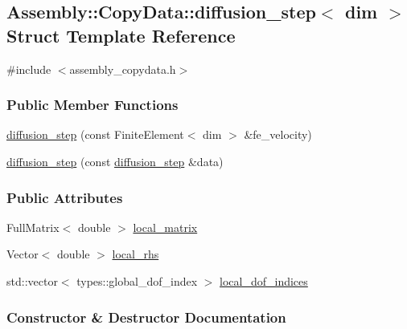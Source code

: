 \hypertarget{struct_assembly_1_1_copy_data_1_1diffusion__step}{}\subsection{Assembly\+:\+:Copy\+Data\+:\+:diffusion\+\_\+step$<$ dim $>$ Struct Template Reference}
\label{struct_assembly_1_1_copy_data_1_1diffusion__step}


{\ttfamily \#include $<$assembly\+\_\+copydata.\+h$>$}

\subsubsection*{Public Member Functions}
\begin{DoxyCompactItemize}
\item 
\hyperlink{struct_assembly_1_1_copy_data_1_1diffusion__step_a7d89f395b7b9b9b7fdfac94c4b18fa39}{diffusion\+\_\+step} (const Finite\+Element$<$ dim $>$ \&fe\+\_\+velocity)
\item 
\hyperlink{struct_assembly_1_1_copy_data_1_1diffusion__step_a09e4da08ff4e3920065387031b39e463}{diffusion\+\_\+step} (const \hyperlink{struct_assembly_1_1_copy_data_1_1diffusion__step}{diffusion\+\_\+step} \&data)
\end{DoxyCompactItemize}
\subsubsection*{Public Attributes}
\begin{DoxyCompactItemize}
\item 
Full\+Matrix$<$ double $>$ \hyperlink{struct_assembly_1_1_copy_data_1_1diffusion__step_ab71ebe2d993b5db8353c7285e2759325}{local\+\_\+matrix}
\item 
Vector$<$ double $>$ \hyperlink{struct_assembly_1_1_copy_data_1_1diffusion__step_ad5d3185b59f3f5c8b56727c7f7722390}{local\+\_\+rhs}
\item 
std\+::vector$<$ types\+::global\+\_\+dof\+\_\+index $>$ \hyperlink{struct_assembly_1_1_copy_data_1_1diffusion__step_acb9f30dc7327a0d8851af7fd52fef039}{local\+\_\+dof\+\_\+indices}
\end{DoxyCompactItemize}


\subsubsection{Constructor \& Destructor Documentation}
\hypertarget{struct_assembly_1_1_copy_data_1_1diffusion__step_a7d89f395b7b9b9b7fdfac94c4b18fa39}{}
